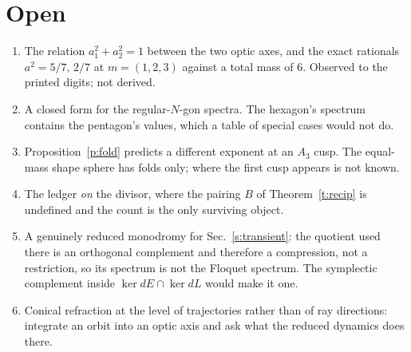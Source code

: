 \documentclass[11pt]{article}
\renewcommand{\S}{Sec.~}
\theoremstyle{remark}
\begin{document}
\section{Open}

\begin{enumerate}
\item The relation $a_1^2+a_2^2=1$ between the two optic axes, and the exact rationals
$a^2=5/7,\,2/7$ at $m=(1,2,3)$ against a total mass of $6$. Observed to the printed digits;
not derived.
\item A closed form for the regular-$N$-gon spectra. The hexagon's spectrum contains the
pentagon's values, which a table of special cases would not do.
\item Proposition~\ref{p:fold} predicts a different exponent at an $A_3$ cusp. The
equal-mass shape sphere has folds only; where the first cusp appears is not known.
\item The ledger \emph{on} the divisor, where the pairing $B$ of Theorem~\ref{t:recip} is
undefined and the count is the only surviving object.
\item A genuinely reduced monodromy for \S\ref{s:transient}: the quotient used there is an
orthogonal complement and therefore a compression, not a restriction, so its spectrum is
not the Floquet spectrum. The symplectic complement inside $\ker dE\cap\ker dL$ would make
it one.
\item Conical refraction at the level of trajectories rather than of ray directions:
integrate an orbit into an optic axis and ask what the reduced dynamics does there.
\end{enumerate}
\end{document}
